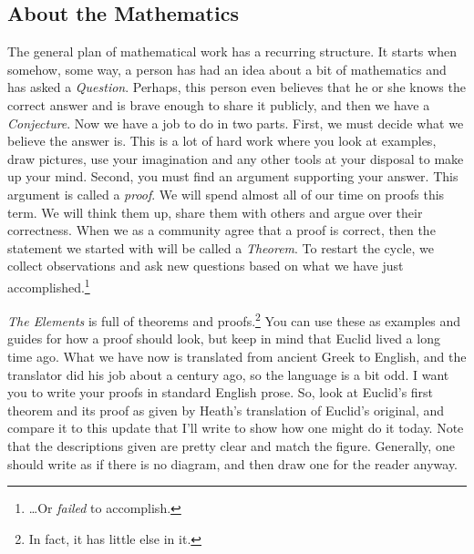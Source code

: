 \subsection*{About the Mathematics}
The general plan of mathematical work has a recurring structure.
It starts when somehow, some way, a person has had an idea about a bit of mathematics and has asked a \emph{Question}.
Perhaps, this person even believes that he or she knows the correct answer and is brave enough to share it publicly, and then we have a \emph{Conjecture}.
Now we have a job to do in two parts.
First, we must decide what we believe the answer is.
This is a lot of hard work where you look at examples, draw pictures, use your imagination and any other tools at your disposal to make up your mind.
Second, you must find an argument supporting your answer.
This argument is called a \emph{proof}.
We will spend almost all of our time on proofs this term. We will think them up, share them with others and argue over their correctness.
When we as a community agree that a proof is correct, then the statement we started with will be called a \emph{Theorem}.
To restart the cycle, we collect observations and ask new questions based on what we have just accomplished.\footnote{\dots Or \emph{failed} to accomplish.}

\emph{The Elements} is full of theorems and proofs.\footnote{In fact, it has little else in it.}
 You can use these as examples and guides for how a proof should look, but keep in mind that Euclid lived a long time ago.
 What we have now is translated from ancient Greek to English, and the translator did his job about a century ago, so the language is a bit odd.
I want you to write your proofs in standard English prose.
So, look at Euclid's first theorem and its proof as given by Heath's translation of Euclid's original, and compare it to this update that I'll write to show how one might do it today.
Note that the descriptions given are pretty clear and match the figure.
Generally, one should write as if there is no diagram, and then draw one for the reader anyway.

